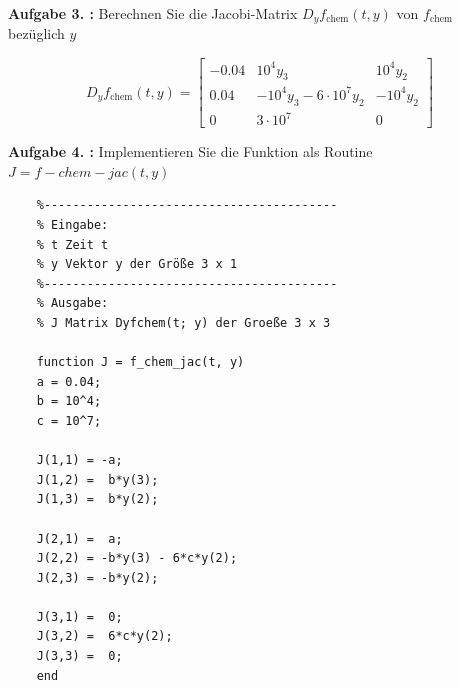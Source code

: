 \begin{mybox}
	\textbf{Aufgabe 3. :}	Berechnen Sie die Jacobi-Matrix $ D_yf_{\mathrm{chem}}(t,y) $ von $ f_{\mathrm{chem}} $ bezüglich $ y $
\end{mybox} 

\begin{equation}
	D_yf_{\mathrm{chem}}(t,y) =
\begin{bmatrix}
	-0.04 & 10^4y_3 & 10^4y_2 \\
	0.04 & -10^4y_3-6\cdot 10^7y_2 & -10^4y_2 \\
	0 & 3\cdot 10^7 & 0 
\end{bmatrix}
\end{equation}

\begin{mybox}
	\textbf{Aufgabe 4. :}	Implementieren Sie die Funktion als Routine $ J = f-chem-jac(t,y) $
\end{mybox}
 
\begin{lstlisting}[style=Matlab-editor]
	% J=f_chem_jac(t,y)
	%-----------------------------------------
	% Eingabe:
	% t Zeit t
	% y Vektor y der Größe 3 x 1
	%-----------------------------------------
	% Ausgabe:
	% J Matrix Dyfchem(t; y) der Groeße 3 x 3

	function J = f_chem_jac(t, y)
	a = 0.04;
	b = 10^4;
	c = 10^7;

	J(1,1) = -a;
	J(1,2) =  b*y(3); 
	J(1,3) =  b*y(2);

	J(2,1) =  a;
	J(2,2) = -b*y(3) - 6*c*y(2);
	J(2,3) = -b*y(2);

	J(3,1) =  0;
	J(3,2) =  6*c*y(2);
	J(3,3) =  0;
	end
\end{lstlisting}

